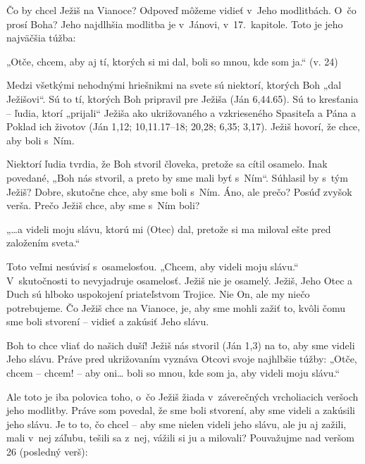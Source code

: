 \def\velkostpisma{9}
\def\velkostriadku{12}



Čo by chcel Ježiš na Vianoce? Odpoveď môžeme vidieť v~Jeho modlitbách. O~čo prosí Boha? Jeho najdlhšia modlitba je v~Jánovi, v~17.~kapitole. Toto je jeho najväčšia túžba:

„Otče, chcem, aby aj tí, ktorých si mi dal, boli so mnou, kde som ja.“ (v. 24)

Medzi všetkými nehodnými hriešnikmi na svete sú niektorí, ktorých Boh „dal Ježišovi“. Sú to tí, ktorých Boh pripravil pre Ježiša (Ján 6,44.65). Sú to kresťania -- ľudia, ktorí „prijali“ Ježiša ako ukrižovaného a vzkrieseného Spasiteľa a Pána a Poklad ich životov (Ján 1,12; 10,11.17–18; 20,28; 6,35; 3,17). Ježiš hovorí, že chce, aby boli s~Ním.

Niektorí ľudia tvrdia, že Boh stvoril človeka, pretože sa cítil osamelo. Inak povedané, „Boh nás stvoril, a preto by sme mali byť s~Ním“. Súhlasil by s~tým Ježiš? Dobre, skutočne chce, aby sme boli s~Ním. Áno, ale prečo? Posúď zvyšok verša. Prečo Ježiš chce, aby sme s~Ním boli?

„…a videli moju slávu, ktorú mi (Otec) dal, pretože si ma miloval ešte pred založením sveta.“

Toto veľmi nesúvisí s~osamelosťou. „Chcem, aby videli moju slávu.“ V~skutočnosti to nevyjadruje osamelosť. Ježiš nie je osamelý. Ježiš, Jeho Otec a Duch sú hlboko uspokojení priateľstvom Trojice. Nie On, ale my niečo potrebujeme. Čo Ježiš chce na Vianoce, je, aby sme mohli zažiť to, kvôli čomu sme boli stvorení -- vidieť a zakúsiť Jeho slávu.

Boh to chce vliať do našich duší! Ježiš nás stvoril (Ján 1,3) na to, aby sme videli Jeho slávu. Práve pred ukrižovaním vyznáva Otcovi svoje najhlbšie túžby: „Otče, chcem -- chcem! -- aby oni… boli so mnou, kde som ja, aby videli moju slávu.“

Ale toto je iba polovica toho, o~čo Ježiš žiada v~záverečných vrcholiacich veršoch jeho modlitby. Práve som povedal, že sme boli stvorení, aby sme videli a zakúsili jeho slávu. Je to to, čo chcel -- aby sme nielen videli jeho slávu, ale ju aj zažili, mali v~nej záľubu, tešili sa z~nej, vážili si ju a milovali? Pouvažujme nad veršom 26 (posledný verš):

